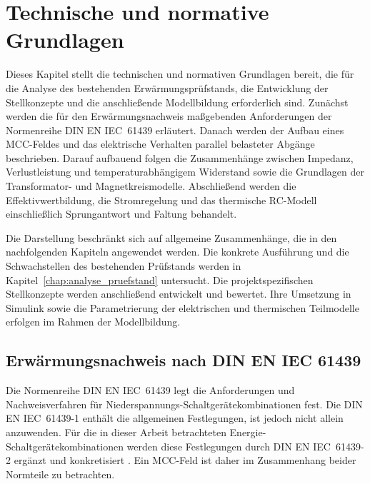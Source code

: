 \section{Technische und normative Grundlagen}
\label{chap:technische_grundlagen}

Dieses Kapitel stellt die technischen und normativen Grundlagen bereit, die
für die Analyse des bestehenden Erwärmungsprüfstands, die Entwicklung der
Stellkonzepte und die anschließende Modellbildung erforderlich sind. Zunächst
werden die für den Erwärmungsnachweis maßgebenden Anforderungen der
Normenreihe DIN EN IEC~61439 erläutert. Danach werden der Aufbau eines
MCC-Feldes und das elektrische Verhalten parallel belasteter Abgänge
beschrieben. Darauf aufbauend folgen die Zusammenhänge zwischen Impedanz,
Verlustleistung und temperaturabhängigem Widerstand sowie die Grundlagen der
Transformator- und Magnetkreismodelle. Abschließend werden die
Effektivwertbildung, die Stromregelung und das thermische RC-Modell
einschließlich Sprungantwort und Faltung behandelt.

Die Darstellung beschränkt sich auf allgemeine Zusammenhänge, die in den
nachfolgenden Kapiteln angewendet werden. Die konkrete Ausführung und die
Schwachstellen des bestehenden Prüfstands werden in
Kapitel~\ref{chap:analyse_pruefstand} untersucht. Die projektspezifischen
Stellkonzepte werden anschließend entwickelt und bewertet. Ihre Umsetzung in
Simulink sowie die Parametrierung der elektrischen und thermischen Teilmodelle
erfolgen im Rahmen der Modellbildung.


\subsection{Erwärmungsnachweis nach DIN EN IEC 61439}
\label{sec:erwaermungspruefung_norm}

Die Normenreihe DIN EN IEC~61439 legt die Anforderungen und
Nachweisverfahren für Niederspannungs-Schaltgerätekombinationen fest. Die
DIN EN IEC~61439-1 enthält die allgemeinen Festlegungen, ist jedoch nicht
allein anzuwenden. Für die in dieser Arbeit betrachteten
Energie-Schaltgerätekombinationen werden diese Festlegungen durch
DIN EN IEC~61439-2 ergänzt und konkretisiert
\parencite[jeweils Abschn.~1]{din_en_61439_1,din_en_61439_2}. Ein
MCC-Feld ist daher im Zusammenhang beider Normteile zu betrachten.


